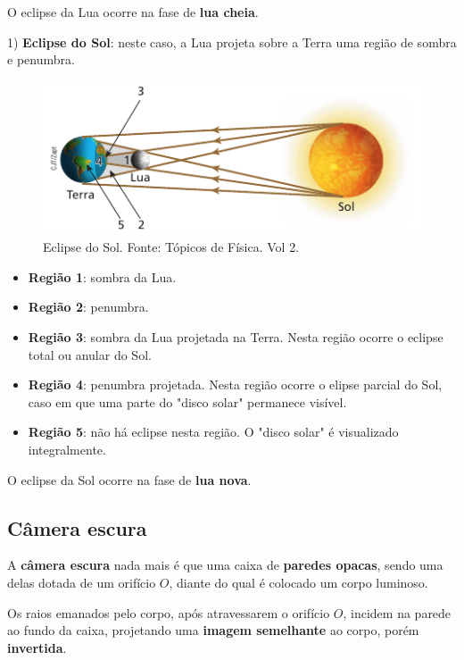 \documentclass[11pt,twocolumn,oneside]{article}
\begin{document}
O eclipse da Lua ocorre na fase de \textbf{lua cheia}.


1) \textbf{Eclipse do Sol}: neste caso, a Lua projeta sobre a Terra uma região de sombra e penumbra.


\begin{figure}[h]{}
\centering\includegraphics[width=2.5truein]{img21.png}
\caption{Eclipse do Sol. Fonte: Tópicos de Física. Vol 2.}
\centering
\end{figure}

\begin{itemize}

\item \textbf{Região 1}: sombra da Lua.

\item \textbf{Região 2}: penumbra.

\item \textbf{Região 3}: sombra da Lua projetada na Terra. Nesta região ocorre o eclipse total ou anular do Sol.

\item \textbf{Região 4}: penumbra projetada. Nesta região ocorre o elipse parcial do Sol, caso em que uma parte do "disco solar" permanece visível.

\item \textbf{Região 5}: não há eclipse nesta região. O "disco solar" é visualizado integralmente.

\end{itemize}


O eclipse da Sol ocorre na fase de \textbf{lua nova}.


\hypertarget{x-câmera-escura}{\subsection{Câmera escura}}
A \textbf{câmera escura} nada mais é que uma caixa de \textbf{paredes opacas}, sendo uma delas dotada de um orifício \textbf{$O$}, diante do qual é colocado um corpo luminoso.


Os raios emanados pelo corpo, após atravessarem o orifício \textbf{$O$}, incidem na parede ao fundo da caixa, projetando uma \textbf{imagem semelhante} ao corpo, porém \textbf{invertida}.
\end{document}
